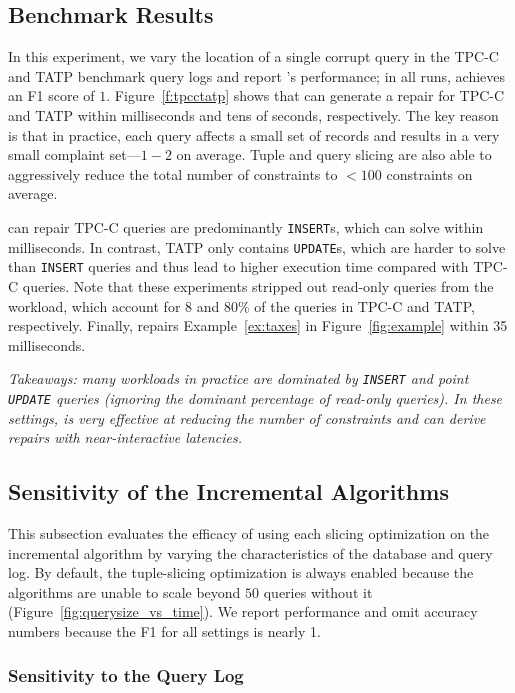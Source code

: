 \subsection{Benchmark Results}
\label{sec:experiments:benchmark}
In this experiment, we vary the location of a single corrupt query in the TPC-C and TATP benchmark query logs and report \sys's performance;
in all runs, \sys achieves an F1 score of $1$.
Figure~\ref{f:tpcctatp} shows that \sys can generate a repair for TPC-C and TATP within milliseconds and tens of seconds, respectively.
The key reason is that in practice, each query affects a small set of records and results in a very small complaint set---$1-2$ on average.
Tuple and query slicing are also able to aggressively reduce the total number of constraints to $<100$ constraints on average.

\sys can repair TPC-C  queries are predominantly \texttt{INSERT}s, which \sys can solve within milliseconds. 
In contrast, TATP only contains \texttt{UPDATE}s, which are harder to solve than \texttt{INSERT} queries and thus lead to higher execution time compared with TPC-C queries.
Note that these experiments stripped out read-only queries from the workload, which account for $8$ and $80\%$ of the queries in TPC-C and TATP, respectively.
Finally, \sys repairs Example~\ref{ex:taxes} in Figure~\ref{fig:example} within 35 milliseconds. 


{\it Takeaways: many workloads in practice are dominated by \texttt{INSERT} and point \texttt{UPDATE} queries (ignoring the dominant percentage of read-only queries).  
In these settings, \sys is very effective at reducing the number of constraints and can derive repairs with near-interactive latencies.}



\subsection{Sensitivity of the Incremental Algorithms}
\label{sec:experiments:inc}


This subsection evaluates the efficacy of using each slicing optimization on the incremental algorithm by varying the characteristics of the database and query log.  
By default, the tuple-slicing optimization is always enabled because the algorithms are unable to scale beyond $50$ queries without it (Figure~\ref{fig:querysize_vs_time}).
We report performance and omit accuracy numbers because the F1 for all settings is nearly 1.


\subsubsection{Sensitivity to the Query Log}
\label{sec:experiments:synth}

